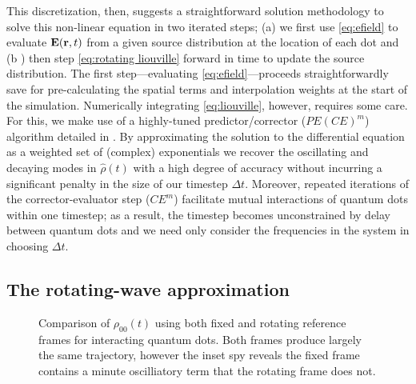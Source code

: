 \documentclass[conference]{IEEEtran}
\begin{document}
This discretization, then, suggests a straightforward solution methodology to solve this non-linear equation in two iterated steps; (a) we first use \cref{eq:efield} to evaluate $\vb{E}(\vb{r}, t)$ from a given source distribution at the location of each dot and (b ) then step \cref{eq:rotating liouville} forward in time to update the source distribution.
The first step---evaluating \cref{eq:efield}---proceeds straightforwardly save for pre-calculating the spatial terms and interpolation weights at the start of the simulation.
Numerically integrating \cref{eq:liouville}, however, requires some care.
For this, we make use of a highly-tuned predictor/corrector ($PE(CE)^m$) algorithm detailed in \cite{Glaser2009}.
By approximating the solution to the differential equation as a weighted set of (complex) exponentials we recover the oscillating and decaying modes in $\hat{\rho}(t)$ with a high degree of accuracy without incurring a significant penalty in the size of our timestep $\Delta t$.
Moreover, repeated iterations of the corrector-evaluator step ($CE^m$) facilitate mutual interactions of quantum dots within one timestep; as a result, the timestep becomes unconstrained by delay between quantum dots and we need only consider the frequencies in the system in choosing $\Delta t$.

\subsection{The rotating-wave approximation}
\begin{figure}
  \centering
  
  \caption{\label{fig:frame comparison}
    Comparison of $\rho_{00}(t)$ using both fixed and rotating reference frames for interacting quantum dots.
    Both frames produce largely the same trajectory, however the inset spy reveals the fixed frame contains a minute oscilliatory term that the rotating frame does not.
  }
\end{figure}
\end{document}

